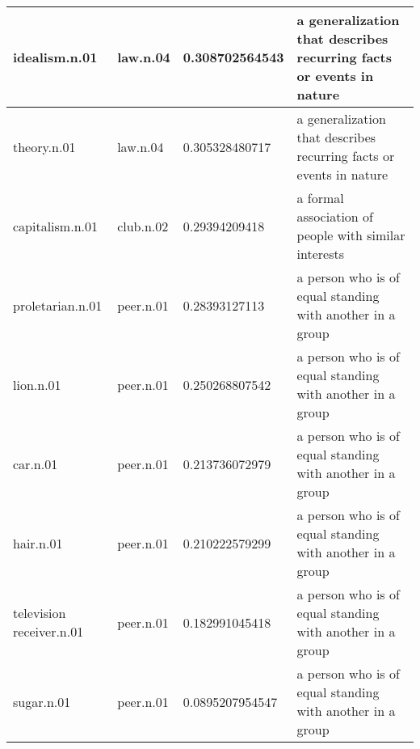 \begin{center}
\begin{tabular}{ | l | l | l | l |}
idealism.n.01 & law.n.04 & 0.308702564543 & a generalization that describes recurring facts or events in nature\\ \hline
theory.n.01 & law.n.04 & 0.305328480717 & a generalization that describes recurring facts or events in nature\\ \hline
capitalism.n.01 & club.n.02 & 0.29394209418 & a formal association of people with similar interests\\ \hline
proletarian.n.01 & peer.n.01 & 0.28393127113 & a person who is of equal standing with another in a group\\ \hline
lion.n.01 & peer.n.01 & 0.250268807542 & a person who is of equal standing with another in a group\\ \hline
car.n.01 & peer.n.01 & 0.213736072979 & a person who is of equal standing with another in a group\\ \hline
hair.n.01 & peer.n.01 & 0.210222579299 & a person who is of equal standing with another in a group\\ \hline
television receiver.n.01 & peer.n.01 & 0.182991045418 & a person who is of equal standing with another in a group\\ \hline
sugar.n.01 & peer.n.01 & 0.0895207954547 & a person who is of equal standing with another in a group\\ \hline
\end{tabular}
\end{center}